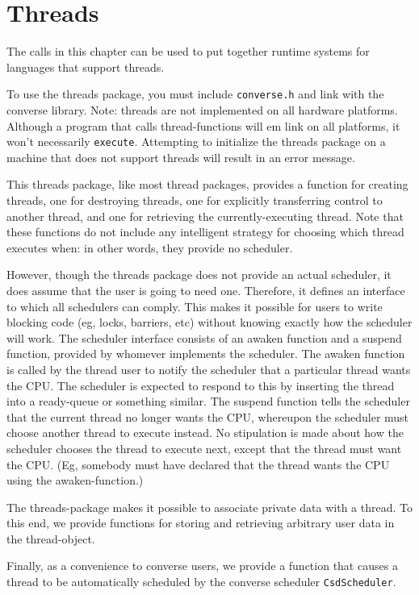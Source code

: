 \chapter{Threads}

The calls in this chapter can be used to put together runtime systems
for languages that support threads.

To use the threads package, you must include {\tt converse.h} and link
with the converse library.  Note: threads are not implemented on all
hardware platforms.  Although a program that calls thread-functions
will {em link} on all platforms, it won't necessarily {\tt execute}.
Attempting to initialize the threads package on a machine that does
not support threads will result in an error message.

This threads package, like most thread packages, provides a function
for creating threads, one for destroying threads, one for explicitly
transferring control to another thread, and one for retrieving the
currently-executing thread.  Note that these functions do not include
any intelligent strategy for choosing which thread executes when: in
other words, they provide no scheduler.

However, though the threads package does not provide an actual
scheduler, it does assume that the user is going to need one.
Therefore, it defines an interface to which all schedulers can comply.
This makes it possible for users to write blocking code (eg, locks,
barriers, etc) without knowing exactly how the scheduler will work.
The scheduler interface consists of an awaken function and a suspend
function, provided by whomever implements the scheduler.  The awaken
function is called by the thread user to notify the scheduler that a
particular thread wants the CPU.  The scheduler is expected to respond
to this by inserting the thread into a ready-queue or something
similar.  The suspend function tells the scheduler that the current
thread no longer wants the CPU, whereupon the scheduler must choose
another thread to execute instead.  No stipulation is made about how
the scheduler chooses the thread to execute next, except that the
thread must want the CPU. (Eg, somebody must have declared that the
thread wants the CPU using the awaken-function.)

The threads-package makes it possible to associate private data
with a thread.  To this end, we provide functions for storing and
retrieving arbitrary user data in the thread-object.

Finally, as a convenience to converse users, we provide a function
that causes a thread to be automatically scheduled by the converse
scheduler {\tt CsdScheduler}.

